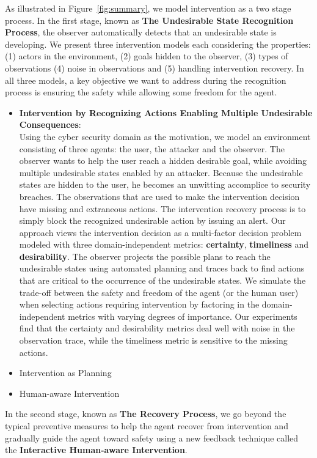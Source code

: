 As illustrated in Figure~\ref{fig:summary}, we model intervention as a two stage process.
In the first stage, known as \textbf{The Undesirable State Recognition Process}, the observer automatically detects that an undesirable state is developing.
We present three intervention models each considering the properties: (1) actors in the environment, (2) goals hidden to the observer, (3) types of observations (4) noise in observations and (5) handling intervention recovery.
In all three models, a key objective we want to address during the recognition process is ensuring the safety while allowing some freedom for the agent.
\begin{itemize}
\item \textbf{Intervention by Recognizing Actions Enabling Multiple Undesirable Consequences}: \\ Using the cyber security domain as the motivation, we model an environment consisting of three agents: the user, the attacker and the observer.
The observer wants to help the user reach a hidden desirable goal, while avoiding multiple undesirable states enabled by an attacker.
Because the undesirable states are hidden to the user, he becomes an unwitting accomplice to security breaches.
The observations that are used to make the intervention decision have missing and extraneous actions.
The intervention recovery process is to simply block the recognized undesirable action by issuing an alert.
Our approach views the intervention decision as a multi-factor decision problem modeled with three domain-independent metrics: \textbf{certainty}, \textbf{timeliness} and \textbf{desirability}.
The observer projects the possible plans to reach the undesirable states using automated planning and traces back to find actions that are critical to the occurrence of the undesirable states.
We simulate the trade-off between the safety and freedom of the agent (or the human user) when selecting actions requiring intervention by factoring in the domain-independent metrics with varying degrees of importance.
Our experiments find that the certainty and desirability  metrics deal well with noise in the observation trace, while the timeliness metric is sensitive to the missing actions.

\item Intervention as Planning
\item Human-aware Intervention
\end{itemize}
In the second stage, known as \textbf{The Recovery Process}, we go beyond the typical preventive measures to help the agent recover from intervention and gradually guide the agent toward safety using a new feedback technique called the \textbf{Interactive Human-aware Intervention}.

